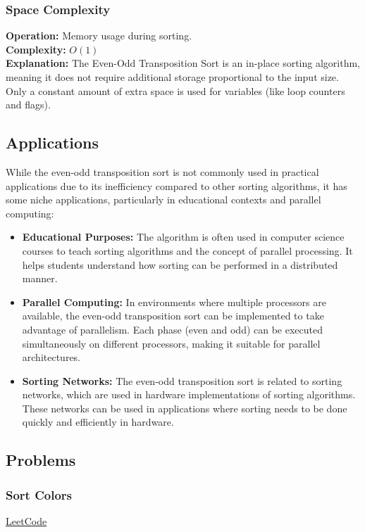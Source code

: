 \subsubsection{Space Complexity}
\textbf{Operation:} Memory usage during sorting. \\
\textbf{Complexity:} $O(1)$ \\
\textbf{Explanation:} The Even-Odd Transposition Sort is an in-place sorting algorithm, meaning it does not require additional storage proportional to the input size. Only a constant amount of extra space is used for variables (like loop counters and flags).

\subsection{Applications}
While the even-odd transposition sort is not commonly used in practical applications due to its inefficiency compared to other sorting algorithms, it has some niche applications, particularly in educational contexts and parallel computing:
\begin{itemize}
    \item \textbf{Educational Purposes:} The algorithm is often used in computer science courses to teach sorting algorithms and the concept of parallel processing. It helps students understand how sorting can be performed in a distributed manner.
    \item \textbf{Parallel Computing:} In environments where multiple processors are available, the even-odd transposition sort can be implemented to take advantage of parallelism. Each phase (even and odd) can be executed simultaneously on different processors, making it suitable for parallel architectures.
    \item \textbf{Sorting Networks:} The even-odd transposition sort is related to sorting networks, which are used in hardware implementations of sorting algorithms. These networks can be used in applications where sorting needs to be done quickly and efficiently in hardware.
\end{itemize}

\subsection{Problems}

\subsubsection{Sort Colors}
\href{https://leetcode.com/problems/sort-colors/description/}{LeetCode}

